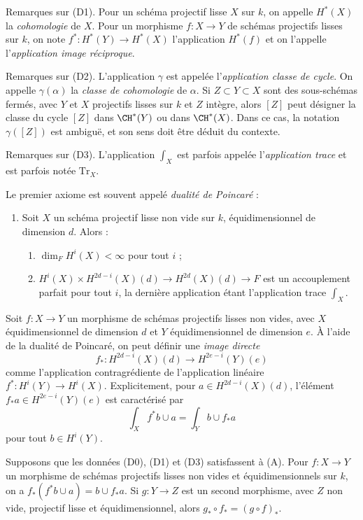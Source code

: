 \medskip\noindent
Remarques sur (D1).
Pour un schéma projectif lisse $X$ sur $k$, on appelle $H^*(X)$
la {\it cohomologie} de $X$. Pour un morphisme $f : X \to Y$
de schémas projectifs lisses sur $k$, on note $f^* : H^*(Y) \to H^*(X)$
l'application $H^*(f)$ et on l'appelle l'{\it application image réciproque}.

\medskip\noindent
Remarques sur (D2). L'application $\gamma$ est appelée l'{\it application classe de cycle}.
On appelle $\gamma(\alpha)$ la {\it classe de cohomologie} de $\alpha$.
Si $Z \subset Y \subset X$ sont des sous-schémas fermés, avec $Y$ et $X$
projectifs lisses sur $k$ et $Z$ intègre, alors $[Z]$ peut
désigner la classe du cycle $[Z]$ dans $\CH^*(Y)$ ou dans $\CH^*(X)$.
Dans ce cas, la notation $\gamma([Z])$ est ambiguë, et son sens
doit être déduit du contexte.

\medskip\noindent
Remarques sur (D3). L'application $\int_X$ est parfois appelée
l'{\it application trace} et est parfois notée $\text{Tr}_X$.

\medskip\noindent
Le premier axiome est souvent appelé {\it dualité de Poincar\'e} :
\begin{enumerate}
\item[(A)] Soit $X$ un schéma projectif lisse non vide sur $k$,
équidimensionnel de dimension $d$. Alors :
\begin{enumerate}
\item $\dim_F H^i(X) < \infty$ pour tout $i$ ;
\item $H^i(X) \times H^{2d - i}(X)(d) \rightarrow
H^{2d}(X)(d) \rightarrow F$
est un accouplement parfait pour tout $i$, la dernière
application étant l'application trace $\int_X$.
\end{enumerate}
\end{enumerate}
Soit $f : X \to Y$ un morphisme de schémas projectifs lisses non vides, avec $X$
équidimensionnel de dimension $d$ et $Y$ équidimensionnel de dimension $e$.
À l'aide de la dualité de Poincar\'e, on peut définir une {\it image directe}
$$
f_* : H^{2d - i}(X)(d) \longrightarrow H^{2e - i}(Y)(e)
$$
comme l'application contragrédiente de l'application linéaire $f^* : H^i(Y) \to H^i(X)$.
Explicitement, pour $a \in H^{2d - i}(X)(d)$, l'élément $f_*a \in H^{2e - i}(Y)(e)$
est caractérisé par
$$
\int_X f^*b \cup a = \int_Y b \cup f_*a
$$
pour tout $b \in H^i(Y)$.

\begin{lemma}
\label{lemma-pushforward}
Supposons que les données (D0), (D1) et (D3) satisfassent à (A). Pour $f : X \to Y$
un morphisme de schémas projectifs lisses non vides et équidimensionnels sur $k$,
on a $f_*(f^*b \cup a) = b \cup f_*a$. Si $g : Y \to Z$ est un second morphisme,
avec $Z$ non vide, projectif lisse et équidimensionnel, alors
$g_* \circ f_* = (g \circ f)_*$.
\end{lemma}

